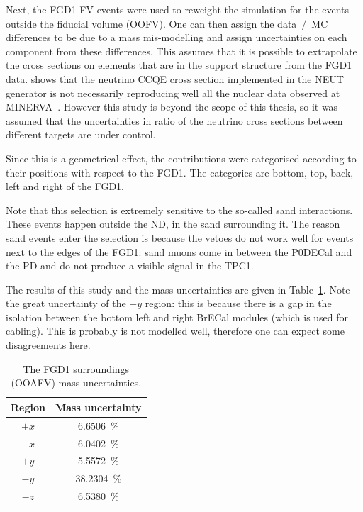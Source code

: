 Next, the \Gls{FGD}1 \Gls{FV} events were used to reweight the
simulation for the events outside the fiducial volume
(\Gls{OOFV}). One can then assign the data~/~\Gls{MC} differences to
be due to a mass mis-modelling and assign uncertainties on each
component from these differences. This assumes that it is possible to
extrapolate the cross sections on elements that are in the support
structure from the \Gls{FGD}1 data. \cite{CallumRatios} shows that the
neutrino \Gls{CCQE} cross section implemented in the \Gls{NEUT}
generator is not necessarily reproducing well all the nuclear data
observed at \Gls{MINERVA}~\cite{MinervaRatios}.  However this study is
beyond the scope of this thesis, so it was assumed that the
uncertainties in ratio of the neutrino cross sections between
different targets are under control.

Since this is a geometrical effect, the contributions were categorised
according to their positions with respect to the \Gls{FGD}1. The
categories are bottom, top, back, left and right of the \Gls{FGD}1.

Note that this selection is extremely sensitive to the so-called
\gls{sand} interactions. These events happen outside the \Gls{ND}, in
the \gls{sand} surrounding it. The reason \gls{sand} events enter the
selection is because the vetoes do not work well for events next to
the edges of the \Gls{FGD}1: \gls{sand} muons come in between the
\Gls{P0DECal} and the \Gls{PD} and do not produce a visible signal in
the \Gls{TPC}1.

The results of this study and the mass uncertainties are given in
Table~\ref{tab:oofvmasserror}.  Note the great uncertainty of the $-y$
region: this is because there is a gap in the isolation between the
bottom left and right \Gls{BrECal} modules (which is used for
cabling). This is probably is not modelled well, therefore one can
expect some disagreements here.

\begin{table}[ht]
  \begin{adjustbox}{center}
    \begin{tabular}{cc}
      \toprule
      Region & Mass uncertainty \\ 
      \midrule
      $+x$     &  6.6506~\%  \\
      $-x$     &  6.0402~\%  \\
      $+y$     &  5.5572~\%  \\
      $-y$     & 38.2304~\%  \\
      $-z$     &  6.5380~\%  \\
      \bottomrule
    \end{tabular}
  \end{adjustbox}
  \caption[The FGD1 surroundings mass uncertainties]{The \Gls{FGD}1
    surroundings (\Gls{OOAFV}) mass uncertainties.}
  \label{tab:oofvmasserror}
\end{table}

